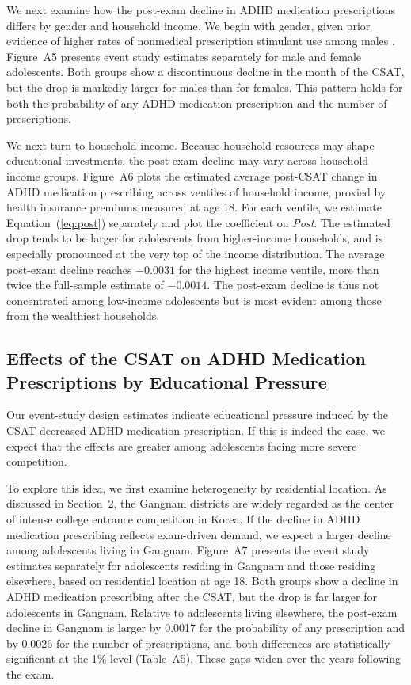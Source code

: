 \documentclass[12pt]{article}
\begin{document}
We next examine how the post-exam decline in ADHD medication prescriptions differs by gender and household income. We begin with gender, given prior evidence of higher rates of nonmedical prescription stimulant use among males \citep{mccabe2005}. Figure~A5 presents event study estimates separately for male and female adolescents. Both groups show a discontinuous decline in the month of the CSAT, but the drop is markedly larger for males than for females. This pattern holds for both the probability of any ADHD medication prescription and the number of prescriptions.

We next turn to household income. Because household resources may shape educational investments, the post-exam decline may vary across household income groups. Figure~A6 plots the estimated average post-CSAT change in ADHD medication prescribing across ventiles of household income, proxied by health insurance premiums measured at age 18. For each ventile, we estimate Equation~(\ref{eq:post}) separately and plot the coefficient on \textit{Post}. The estimated drop tends to be larger for adolescents from higher-income households, and is especially pronounced at the very top of the income distribution. The average post-exam decline reaches $-0.0031$ for the highest income ventile, more than twice the full-sample estimate of $-0.0014$. The post-exam decline is thus not concentrated among low-income adolescents but is most evident among those from the wealthiest households.

\subsection{Effects of the CSAT on ADHD Medication Prescriptions by Educational Pressure}

Our event-study design estimates indicate educational pressure induced by the CSAT decreased ADHD medication prescription. If this is indeed the case, we expect that the effects are greater among adolescents facing more severe competition.

To explore this idea, we first examine heterogeneity by residential location. As discussed in Section~2, the Gangnam districts are widely regarded as the center of intense college entrance competition in Korea. If the decline in ADHD medication prescribing reflects exam-driven demand, we expect a larger decline among adolescents living in Gangnam. Figure~A7 presents the event study estimates separately for adolescents residing in Gangnam and those residing elsewhere, based on residential location at age 18. Both groups show a decline in ADHD medication prescribing after the CSAT, but the drop is far larger for adolescents in Gangnam. Relative to adolescents living elsewhere, the post-exam decline in Gangnam is larger by 0.0017 for the probability of any prescription and by 0.0026 for the number of prescriptions, and both differences are statistically significant at the 1\% level (Table~A5). These gaps widen over the years following the exam.
\end{document}

